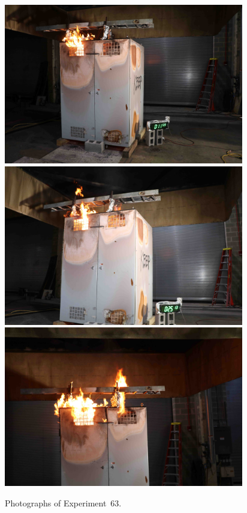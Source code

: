 \begin{figure}[p]
\centering
\includegraphics[height=2.75in]{../FIGURES/Test_63_11_min_59_s} \\
\includegraphics[height=2.75in]{../FIGURES/Test_63_25_min_13_s} \\
\includegraphics[height=2.75in]{../FIGURES/Test_63_ignition}
\caption[Photographs of Experiment~63]{Photographs of Experiment~63.}
\label{fig:Test_63_photos}
\end{figure}


\clearpage

